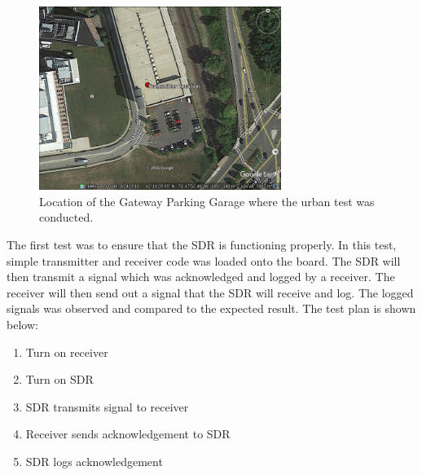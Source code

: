 \begin{figure}[ht!]
	\centering
	\includegraphics[width=0.70\textwidth]{img/gateway_garage}
	\caption{Location of the Gateway Parking Garage where the urban test was conducted.}
	\label{fig:gateway}
\end{figure}\par

The first test was to ensure that the SDR is functioning properly. In this test, simple transmitter and receiver code was loaded onto the board. The SDR will then transmit a signal which was acknowledged and logged by a receiver. The receiver will then send out a signal that the SDR will receive and log. The logged signals was observed and compared to the expected result. The test plan is shown below:

\begin{enumerate}
   \item Turn on receiver
   \item Turn on SDR
   \item SDR transmits signal to receiver
   \item Receiver sends acknowledgement to SDR
   \item SDR logs acknowledgement
\end{enumerate}


\par 

